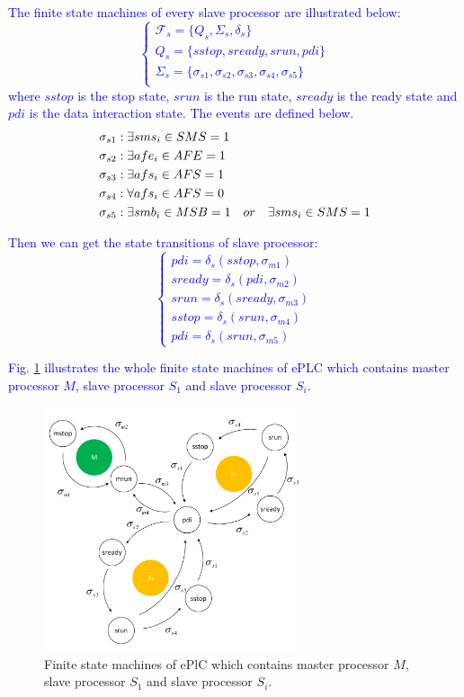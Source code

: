 \documentclass[journal,UTF8]{IEEEtran}
\begin{document}
 
 \textcolor{blue}{The finite state machines of every slave processor are illustrated below:
 \begin{equation}
 \left\{
 \begin{array}{l}
 \mathcal{F}_{s} = \{Q_s, \Sigma_s, \delta_s\}\\
 Q_s = \{sstop, sready, srun, pdi\}\\
 \Sigma_s = \{\sigma_{s1}, \sigma_{s2}, \sigma_{s3}, \sigma_{s4}, \sigma_{s5}\}\\
 \end{array}
 \right.
 \end{equation}
 where $sstop$ is the stop state, $srun$ is the run state, $sready$ is the ready state and $pdi$ is the data interaction state. The events are defined below.
\begin{align}
\notag\sigma_{s1}&: \exists sms_i \in SMS = 1\\
\notag\sigma_{s2}&: \exists afe_i \in AFE = 1\\
\notag\sigma_{s3}&: \exists afs_i \in AFS = 1\\
\notag\sigma_{s4}&: \forall afs_i \in AFS = 0\\
\notag\sigma_{s5}&: \exists smb_i \in MSB = 1\quad or \quad \exists sms_i \in SMS = 1
\end{align}}

 
 \textcolor{blue}{Then we can get the state transitions of slave processor:
 \begin{equation}
 \left\{
 \begin{array}{l}
 pdi = \delta_s (sstop, \sigma_{m1})\\
 sready = \delta_s (pdi, \sigma_{m2})\\
 srun = \delta_s (sready, \sigma_{m3})\\
 sstop = \delta_s (srun, \sigma_{m4})\\
 pdi =  \delta_s (srun, \sigma_{m5})
 \end{array}
 \right.
 \end{equation}}

\textcolor{blue}{Fig. \ref{fig:state} illustrates the whole finite state machines of ePLC which contains master processor $M$, slave processor $S_1$ and slave processor $S_i$.}
 \begin{figure}
	\centering
	\includegraphics[width=3in]{fig/state.pdf}
	\caption{ Finite state machines of ePlC which contains master processor $M$, slave processor $S_1$ and slave processor $S_i$.}
	\label{fig:state}
\end{figure}
\end{document}
